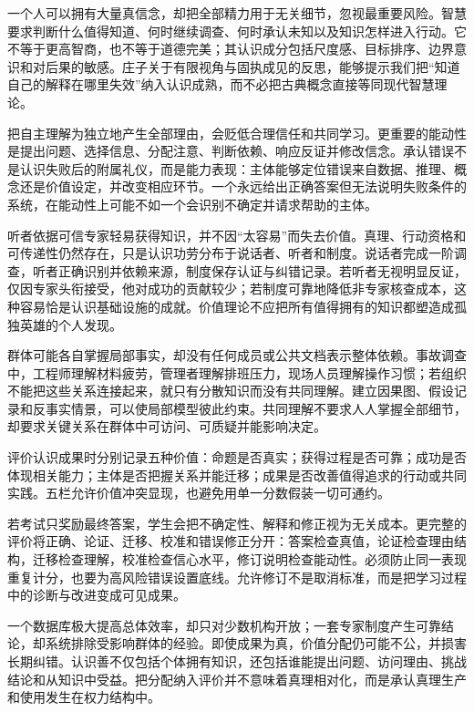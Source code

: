 一个人可以拥有大量真信念，却把全部精力用于无关细节，忽视最重要风险。智慧要求判断什么值得知道、何时继续调查、何时承认未知以及知识怎样进入行动。它不等于更高智商，也不等于道德完美；其认识成分包括尺度感、目标排序、边界意识和对后果的敏感。庄子关于有限视角与固执成见的反思，能够提示我们把“知道自己的解释在哪里失效”纳入认识成熟，而不必把古典概念直接等同现代智慧理论\parencite{zhuangzi2009}。

把自主理解为独立地产生全部理由，会贬低合理信任和共同学习。更重要的能动性是提出问题、选择信息、分配注意、判断依赖、响应反证并修改信念。承认错误不是认识失败后的附属礼仪，而是能力表现：主体能够定位错误来自数据、推理、概念还是价值设定，并改变相应环节。一个永远给出正确答案但无法说明失败条件的系统，在能动性上可能不如一个会识别不确定并请求帮助的主体。

听者依据可信专家轻易获得知识，并不因“太容易”而失去价值。真理、行动资格和可传递性仍然存在，只是认识功劳分布于说话者、听者和制度。说话者完成一阶调查，听者正确识别并依赖来源，制度保存认证与纠错记录。若听者无视明显反证，仅因专家头衔接受，他对成功的贡献较少；若制度可靠地降低非专家核查成本，这种容易恰是认识基础设施的成就。价值理论不应把所有值得拥有的知识都塑造成孤独英雄的个人发现。

群体可能各自掌握局部事实，却没有任何成员或公共文档表示整体依赖。事故调查中，工程师理解材料疲劳，管理者理解排班压力，现场人员理解操作习惯；若组织不能把这些关系连接起来，就只有分散知识而没有共同理解。建立因果图、假设记录和反事实情景，可以使局部模型彼此约束。共同理解不要求人人掌握全部细节，却要求关键关系在群体中可访问、可质疑并能影响决定。

\begin{argumentbox}
评价认识成果时分别记录五种价值：命题是否真实；获得过程是否可靠；成功是否体现相关能力；主体是否把握关系并能迁移；成果是否改善值得追求的行动或共同实践。五栏允许价值冲突显现，也避免用单一分数假装一切可通约。
\end{argumentbox}

若考试只奖励最终答案，学生会把不确定性、解释和修正视为无关成本。更完整的评价将正确、论证、迁移、校准和错误修正分开：答案检查真值，论证检查理由结构，迁移检查理解，校准检查信心水平，修订说明检查能动性。必须防止同一表现重复计分，也要为高风险错误设置底线。允许修订不是取消标准，而是把学习过程中的诊断与改进变成可见成果。

一个数据库极大提高总体效率，却只对少数机构开放；一套专家制度产生可靠结论，却系统排除受影响群体的经验。即使成果为真，价值分配仍可能不公，并损害长期纠错。认识善不仅包括个体拥有知识，还包括谁能提出问题、访问理由、挑战结论和从知识中受益。把分配纳入评价并不意味着真理相对化，而是承认真理生产和使用发生在权力结构中。

